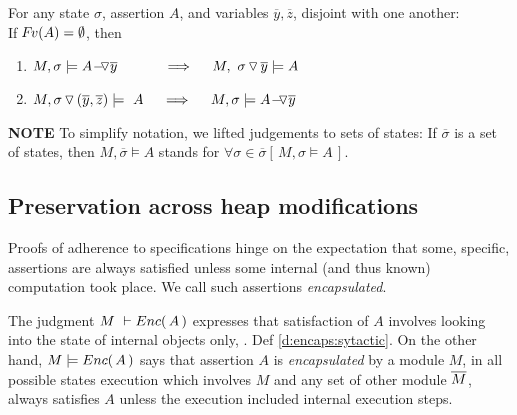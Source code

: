 {\begin{lemma} 
\label{lemma:push:ass:state}
For any state  $\sigma$, assertion $A$, and variables   $\overline y, \overline z$, disjoint with one another:
\\
If  ${\hspace{-1pt}F\hspace{-1pt}}v(A)=\emptyset$, then
\begin{enumerate}
 \item
 \label{lemma:push:ass:state:one}
$M, \sigma \models \PushAS {y} {A}\ \ \ \ \ \ \  \ \ \    \Longrightarrow  \ \ \ \ M,  \PushS {y} {\sigma}   \models A$
\item
\label{lemma:push:ass:state:two}
$M, { \PushSLong {(\overline y, \overline z)} {\sigma} } \models\  A \  \ \ \ \Longrightarrow  \ \ \ \ M,  \sigma \models  \PushAS  {y} {A}$
\end{enumerate}
\end{lemma}



\noindent
\textbf{NOTE}   
To simplify notation,  we lifted %
judgements to sets of states: If  $\overline{\sigma}$ is a set of states,  then
$M,   \overline{\sigma} \models A$ stands for  $\forall\sigma\! \in\! \overline{\sigma}[\, M,\sigma \models A \, ]$.    

 
\subsection{Preservation across heap modifications}

 
Proofs of adherence to {\SpecLang specifications  hinge on the expectation that some,  specific, assertions are always satisfied unless some 
} internal (and thus known) computation took place. 
{We call such assertions   \emph{encapsulated}.}
 

The judgment $M\ \vdash {\ensuremath Enc(\, A\, )}$  expresses that satisfaction of $A$ involves looking into the state of  
internal objects only,  \cf. Def \ref{d:encaps:sytactic}.
{On the other hand, $M  \models {\ensuremath Enc(\, A\, )}$ says that assertion $A$  is  \emph{encapsulated} by a module $M$, \ie in all possible states %
execution which involves $M$ and any set of other module $\overline{M}$, always satisfies  $A$  unless the execution  included internal execution steps}.
 

}
